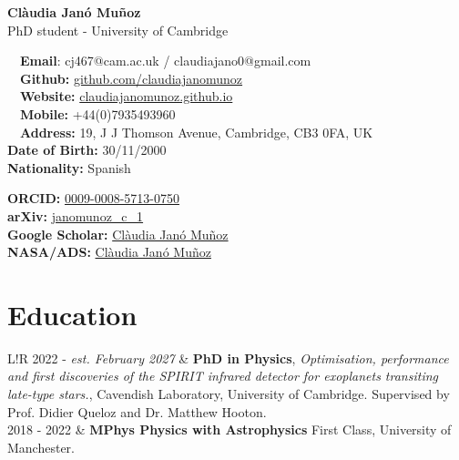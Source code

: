 \documentclass{article}
\begin{document}
\small %


\begin{center}
\huge
\textbf{Clàudia Janó Muñoz} \\
\normalsize
PhD student - University of Cambridge \\
\end{center}

\begin{minipage}[ht]{0.6\linewidth}
	\faEnvelope~~\textbf{Email}: cj467@cam.ac.uk / claudiajano0@gmail.com\\
	\faGithub~~\textbf{Github:} \href{https://github.com/claudiajanomunoz}{github.com/claudiajanomunoz}\\
	\faGlobe~~\textbf{Website:} \href{https://claudiajanomunoz.github.io}{claudiajanomunoz.github.io} \\
  \faPhone~~\textbf{Mobile:} +44(0)7935493960 \\
  \faMapMarker~~\textbf{Address:} 19, J J Thomson Avenue, Cambridge, CB3 0FA, UK \\
  \textbf{Date of Birth:} 30/11/2000 \\
  \textbf{Nationality:} Spanish \\
\end{minipage}
\begin{minipage}[ht]{0.34\linewidth}
	\begin{flushright}
    \textbf{ORCID:} \href{https://orcid.org/0009-0008-5713-0750}{0009-0008-5713-0750} \\
    \textbf{arXiv:} \href{http://arxiv.org/a/janomunoz_c_1}{janomunoz\_c\_1} \\
    \textbf{Google Scholar:} \href{https://scholar.google.com/citations?user=7sh8LMYAAAAJ&hl=en&oi=sra}{Clàudia Janó Muñoz} \\
    \textbf{NASA/ADS:} \href{https://ui.adsabs.harvard.edu/search/q=author%3A%22Janó%20Muñoz%2C%20C.%22&sort=date%20desc%2C%20bibcode%20desc&p_=0}{Clàudia Janó Muñoz} \\
	\end{flushright}
\end{minipage}

\section*{Education}
\begin{tabular}{L!{\vrule}R}
	2022 - \textit{est. February 2027} & \textbf{PhD in Physics}, \textit{Optimisation, performance and first discoveries of the SPIRIT infrared detector for exoplanets transiting late-type stars.}, Cavendish Laboratory, University of Cambridge. Supervised by Prof. Didier Queloz and Dr. Matthew Hooton. \\
	2018 - 2022 & \textbf{MPhys Physics with Astrophysics} First Class, University of Manchester.  \\
\end{tabular}
\end{document}
